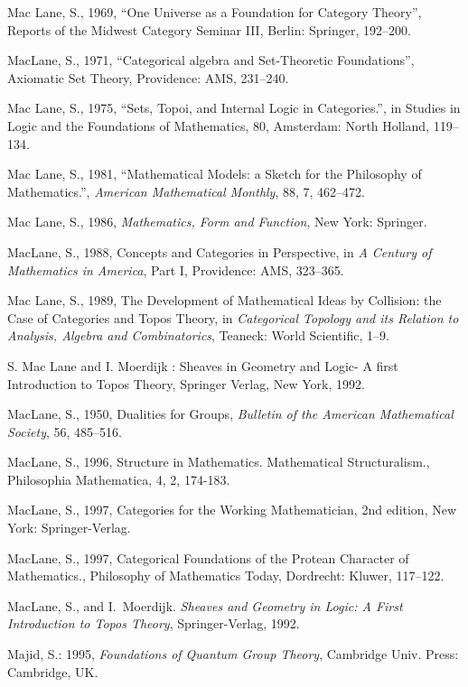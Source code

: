 \documentclass[12pt]{article}
\theoremstyle{plain}
\theoremstyle{definition}
\numberwithin{equation}{section}
\begin{document}
\begin{thebibliography}{99}
Mac Lane, S., 1969, ``One Universe as a Foundation for Category Theory'', Reports of the Midwest Category Seminar III, Berlin: Springer, 192--200. 

MacLane, S., 1971, ``Categorical algebra and Set-Theoretic Foundations'', Axiomatic Set Theory, Providence: AMS, 231--240. 

Mac Lane, S., 1975, ``Sets, Topoi, and Internal Logic in Categories.'', in {Studies in Logic and the Foundations of Mathematics}, 80, Amsterdam: North Holland, 119--134. 

Mac Lane, S., 1981, ``Mathematical Models: a Sketch for the Philosophy of Mathematics.'', \emph{American Mathematical Monthly}, 88, 7, 462--472.
 
Mac Lane, S., 1986, \emph{Mathematics, Form and Function}, New York: Springer. 

MacLane, S., 1988, Concepts and Categories in Perspective, in \emph{A Century of Mathematics in America}, Part I, Providence: AMS, 323--365. 

Mac Lane, S., 1989, The Development of Mathematical Ideas by Collision: the Case of Categories and Topos Theory, in 
\emph{Categorical Topology and its Relation to Analysis, Algebra and Combinatorics}, Teaneck: World Scientific, 1--9.

S. Mac Lane and I. Moerdijk : Sheaves in Geometry and Logic- A first Introduction to Topos Theory, Springer Verlag, New York, 1992. 

MacLane, S., 1950, Dualities for Groups, \emph{Bulletin of the American Mathematical Society}, 56, 485--516. 

MacLane, S., 1996, Structure in Mathematics. Mathematical Structuralism., Philosophia Mathematica, 4, 2, 174-183. 

MacLane, S., 1997, Categories for the Working Mathematician, 2nd edition, New York: Springer-Verlag. 

MacLane, S., 1997, Categorical Foundations of the Protean Character of Mathematics., Philosophy of Mathematics Today, Dordrecht: Kluwer, 117--122. 

MacLane, S., and I.~Moerdijk. {\em Sheaves and Geometry in Logic: A First Introduction to Topos Theory}, Springer-Verlag, 1992.

Majid, S.: 1995, \emph{Foundations of Quantum Group Theory}, Cambridge Univ. Press: Cambridge, UK.


\end{thebibliography}
\end{document}
